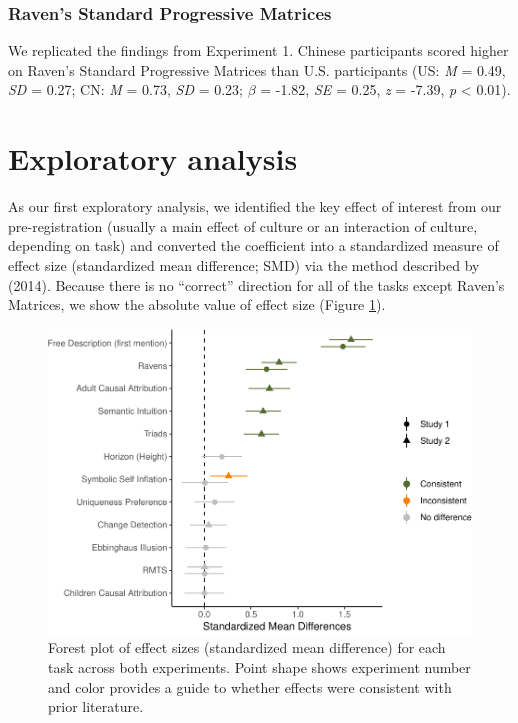 \documentclass[
  man,floatsintext]{apa6}
\begin{document}
\hypertarget{ravens-standard-progressive-matrices-2}{%
\subsubsection{Raven's Standard Progressive Matrices}\label{ravens-standard-progressive-matrices-2}}

We replicated the findings from Experiment 1. Chinese participants scored higher on Raven's Standard Progressive Matrices than U.S. participants (US: \emph{M} = 0.49, \emph{SD} = 0.27; CN: \emph{M} = 0.73, \emph{SD} = 0.23; \(\beta\) = -1.82, \emph{SE} = 0.25, \emph{z} = -7.39, \emph{p} \textless{} 0.01).

\hypertarget{exploratory-analysis}{%
\section{Exploratory analysis}\label{exploratory-analysis}}

As our first exploratory analysis, we identified the key effect of interest from our pre-registration (usually a main effect of culture or an interaction of culture, depending on task) and converted the coefficient into a standardized measure of effect size (standardized mean difference; SMD) via the method described by (2014). Because there is no ``correct'' direction for all of the tasks except Raven's Matrices, we show the absolute value of effect size (Figure \ref{fig:es-plot}).

\begin{figure}
\centering
\includegraphics{CCRR_manuscript_files/figure-latex/es-plot-1.pdf}
\caption{\label{fig:es-plot}Forest plot of effect sizes (standardized mean difference) for each task across both experiments. Point shape shows experiment number and color provides a guide to whether effects were consistent with prior literature.}
\end{figure}
\end{document}
